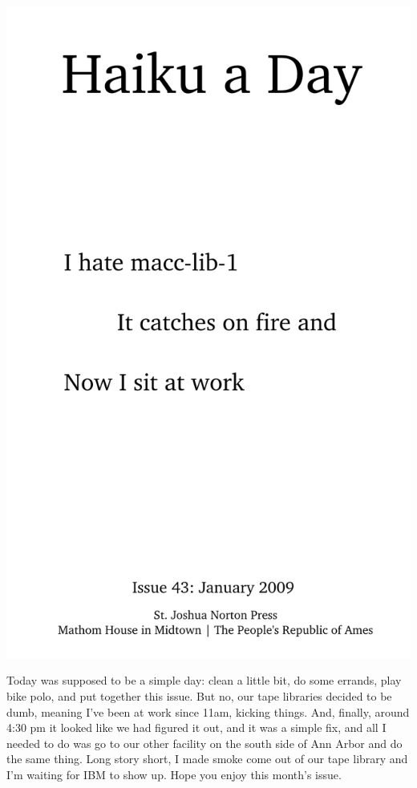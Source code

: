 \documentclass[12pt]{article}
\begin{document}
\includegraphics{frontpage.png}

\newpage

Today was supposed to be a simple day: clean a little bit, do some
errands, play bike polo, and put together this issue.
But no, our tape libraries decided to be dumb, meaning I've
been at work since 11am, kicking things. And, finally, around 4:30 pm
it looked like we had figured it out, and it was a simple fix, and all
I needed to do was go to our other facility on the south side of 
Ann Arbor and do the same thing. Long story short, I made smoke come 
out of our tape library and I'm waiting for IBM to show up. Hope you 
enjoy this month's issue.
\end{document}
